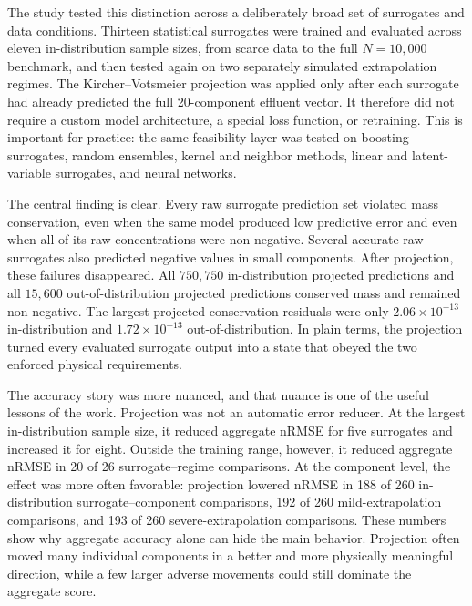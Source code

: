 \documentclass[a4paper,fleqn]{cas-sc}
\begin{document}
The study tested this distinction across a deliberately broad set of surrogates and data conditions. Thirteen statistical surrogates were trained and evaluated across eleven in-distribution sample sizes, from scarce data to the full $N=10{,}000$ benchmark, and then tested again on two separately simulated extrapolation regimes. The Kircher--Votsmeier projection was applied only after each surrogate had already predicted the full 20-component effluent vector. It therefore did not require a custom model architecture, a special loss function, or retraining. This is important for practice: the same feasibility layer was tested on boosting surrogates, random ensembles, kernel and neighbor methods, linear and latent-variable surrogates, and neural networks.

The central finding is clear. Every raw surrogate prediction set violated mass conservation, even when the same model produced low predictive error and even when all of its raw concentrations were non-negative. Several accurate raw surrogates also predicted negative values in small components. After projection, these failures disappeared. All $750{,}750$ in-distribution projected predictions and all $15{,}600$ out-of-distribution projected predictions conserved mass and remained non-negative. The largest projected conservation residuals were only $2.06\times10^{-13}$ in-distribution and $1.72\times10^{-13}$ out-of-distribution. In plain terms, the projection turned every evaluated surrogate output into a state that obeyed the two enforced physical requirements.

The accuracy story was more nuanced, and that nuance is one of the useful lessons of the work. Projection was not an automatic error reducer. At the largest in-distribution sample size, it reduced aggregate nRMSE for five surrogates and increased it for eight. Outside the training range, however, it reduced aggregate nRMSE in 20 of 26 surrogate--regime comparisons. At the component level, the effect was more often favorable: projection lowered nRMSE in 188 of 260 in-distribution surrogate--component comparisons, 192 of 260 mild-extrapolation comparisons, and 193 of 260 severe-extrapolation comparisons. These numbers show why aggregate accuracy alone can hide the main behavior. Projection often moved many individual components in a better and more physically meaningful direction, while a few larger adverse movements could still dominate the aggregate score.
\end{document}
